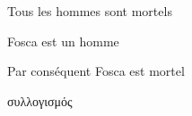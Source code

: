 %	
%	

\epigraph{
	Tous les hommes sont mortels 
	
	Fosca est un homme
	
	Par conséquent Fosca est mortel
}{
	\textgreek{
		συλλογισμός
	}
}

